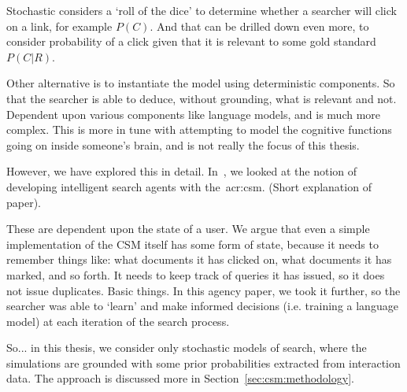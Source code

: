 Stochastic considers a `roll of the dice' to determine whether a searcher will click on a link, for example $P(C)$. And that can be drilled down even more, to consider probability of a click given that it is relevant to some gold standard $P(C|R)$.

Other alternative is to instantiate the model using deterministic components.
So that the searcher is able to deduce, without grounding, what is relevant and not. Dependent upon various components like language models, and is much more complex. This is more in tune with attempting to model the cognitive functions going on inside someone's brain, and is not really the focus of this thesis.

However, we have explored this in detail. In~\cite{maxwell2016agents}, we looked at the notion of developing intelligent search agents with the~\gls{acr:csm}. (Short explanation of paper).

These are dependent upon the state of a user. We argue that even a simple implementation of the CSM itself has some form of state, because it needs to remember things like: what documents it has clicked on, what documents it has marked, and so forth. It needs to keep track of queries it has issued, so it does not issue duplicates. Basic things. In this agency paper, we took it further, so the searcher was able to `learn' and make informed decisions (i.e. training a language model) at each iteration of the search process.

So... in this thesis, we consider only stochastic models of search, where the simulations are grounded with some prior probabilities extracted from interaction data. The approach is discussed more in Section~\ref{sec:csm:methodology}.